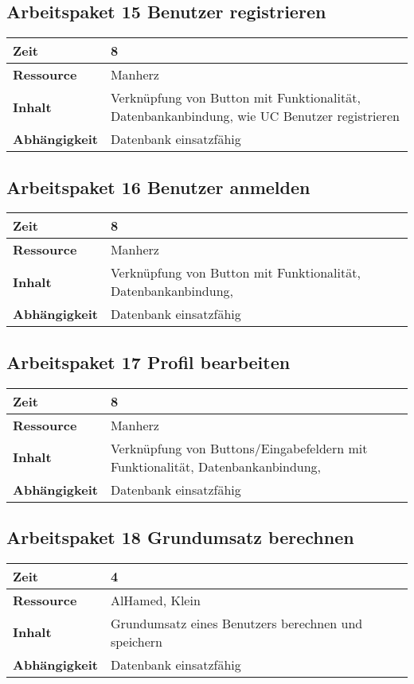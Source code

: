 \documentclass[12pt,a4paper,onecolumn]{article}
\begin{document}
\subsection{Arbeitspaket 15 Benutzer registrieren}
\begin{tabularx}{\textwidth}{|l|X|}
\hline
     \textbf{Zeit} & 8 \\
     \hline
     \textbf{Ressource} & Manherz\\
     \hline
     \textbf{Inhalt} & Verknüpfung von Button mit Funktionalität, Datenbankanbindung, wie UC Benutzer registrieren\\
     \hline
     \textbf{Abhängigkeit} & Datenbank einsatzfähig\\
\hline
\end{tabularx}

\subsection{Arbeitspaket 16 Benutzer anmelden}
\begin{tabularx}{\textwidth}{|l|X|}
\hline
     \textbf{Zeit} & 8\\
     \hline
     \textbf{Ressource} & Manherz\\
     \hline
     \textbf{Inhalt} &  Verknüpfung von Button mit Funktionalität, Datenbankanbindung,\\
     \hline
     \textbf{Abhängigkeit} & Datenbank einsatzfähig\\
\hline
\end{tabularx}

\subsection{Arbeitspaket 17 Profil bearbeiten}
\begin{tabularx}{\textwidth}{|l|X|}
\hline
     \textbf{Zeit} & 8\\
     \hline
     \textbf{Ressource} & Manherz\\
     \hline
     \textbf{Inhalt} &  Verknüpfung von Buttons/Eingabefeldern mit Funktionalität, Datenbankanbindung,\\
     \hline
     \textbf{Abhängigkeit} & Datenbank einsatzfähig\\
\hline
\end{tabularx}



\subsection{Arbeitspaket 18 Grundumsatz berechnen}
\begin{tabularx}{\textwidth}{|l|X|}
\hline
     \textbf{Zeit} & 4 \\
     \hline
     \textbf{Ressource} & AlHamed, Klein \\
     \hline
     \textbf{Inhalt} &  Grundumsatz eines Benutzers berechnen und speichern\\
     \hline
     \textbf{Abhängigkeit} & Datenbank einsatzfähig \\
\hline
\end{tabularx}
\end{document}
